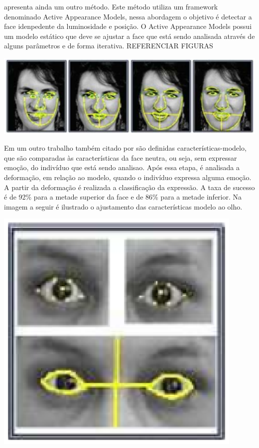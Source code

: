  apresenta ainda um outro método. Este método utiliza um framework denominado Active Appearance Models, nessa abordagem o objetivo é detectar a face idenpedente da luminosidade e posição. O  Active Appearance Models
possui um modelo estático que deve se ajustar a face que está sendo analisada através de alguns parâmetros e de forma iterativa. REFERENCIAR FIGURAS
\begin{center}
	\includegraphics[scale=0.5]{graficos/metodo2_classi}
\end{center}

Em um outro trabalho também citado por  são definidas características-modelo, que são comparadas às características da face neutra, ou seja, sem expressar emoção, do indivíduo que está sendo analisao. Após essa etapa, é analisada a deformação, em relação ao modelo, quando o indivíduo expressa alguma emoção. A partir da deformação é realizada a classificação da expressão. A taxa de sucesso é de 92\% para a metade superior da face e de
86\% para a metade inferior. Na imagem a seguir é ilustrado o ajustamento das características modelo ao olho.
\begin{center}
	\includegraphics[scale=0.5]{graficos/metodo3_classi}
\end{center}

